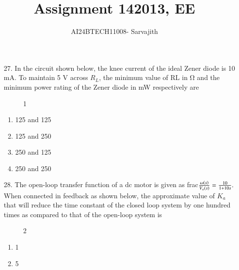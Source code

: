\documentclass[journal]{IEEEtran}
\begin{document}

\vspace{3cm}


\author{AI24BTECH11008- Sarvajith
}
\title{Assignment 14}
{\let\newpage\relax\maketitle}
\title{2013, EE}
\renewcommand{\thefigure}{\theenumi}
\renewcommand{\thetable}{\theenumi}
\setlength{\intextsep}{10pt} %
\renewcommand{\thetable}{\theenumi}
\begin{enumerate}
    \item[27.] In the circuit shown below, the knee current of the ideal Zener diode is 10 mA. To maintain 5 V
    across $R_L$, the minimum value of RL in Ω and the minimum power rating of the Zener diode in mW
    respectively are
    \begin{figure}[!ht]
        \centering
        \caption{1}
    \end{figure}
    \begin{enumerate}[label=(\Alph*)]
        \item 125 and 125
        \item 125 and 250
        \item 250 and 125
        \item 250 and 250
    \end{enumerate}
    \item[28.] The open-loop transfer function of a dc motor is given as frac$\frac{\omega\left(s\right)}{V_a\left(s\right)} = \frac{10}{1+10s}.$ When connected in
    feedback as shown below, the approximate value of $K_a$ that will reduce the time constant of the
    closed loop system by one hundred times as compared to that of the open-loop system is 
    \begin{figure}[!ht]
        \centering
        \caption{2}
    \end{figure}
    \begin{enumerate}[label=(\Alph*)]
        \item 1
        \item 5

\end{enumerate}
\end{enumerate}
\end{document}
